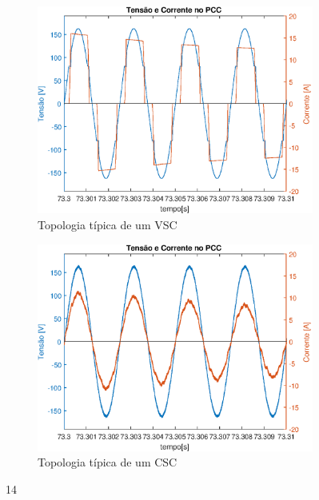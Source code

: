 \begin{figure}[!htb] %
	\centering
	\begin{subfigure}[b]{0.48\textwidth}
		\centering
		\includegraphics[width=\textwidth]{Cap4/Figuras/resultados_unfilt_14.eps}
		\caption{Topologia típica de um VSC} 
		\label{fig:resultados_unfilt_14.eps}
	\end{subfigure}%
		\hfill
	\begin{subfigure}[b]{0.48\textwidth}  
		\centering 
		\includegraphics[width=\textwidth]{Cap4/Figuras/resultados_filt_14.eps}
		\caption{Topologia típica de um CSC}    
		\label{fig:resultados_filt_14.eps}
	\end{subfigure}%
	\caption{14}
	\label{fig:14}
\end{figure}

